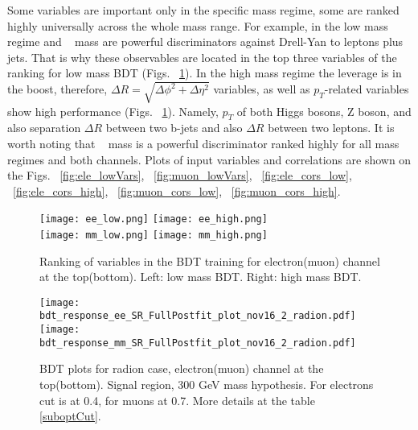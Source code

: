 Some variables are important only in the specific mass regime, some are ranked highly universally across the whole mass range. For example, in the low mass regime \ETmiss and \HBB~ mass are powerful discriminators against Drell-Yan to leptons plus jets. That is why these
observables are located in the top three variables of the ranking for low mass BDT (Figs. ~\ref{fig:ranking}). In the high mass regime the leverage is in the boost, therefore, $\Delta R = \sqrt{\Delta \phi^2 + \Delta \eta^2}$ variables, as well as $p_{T}$-related variables show high performance (Figs. ~\ref{fig:ranking}). Namely, $p_{T}$ of both Higgs bosons, Z boson, and also
separation $\Delta R $  between two b-jets and also $\Delta R$ between  two leptons. It is worth noting that \HBB~ mass is a powerful discriminator ranked highly for all mass regimes and both channels. Plots of input variables and correlations are shown on the Figs. ~\ref{fig:ele_lowVars}, ~\ref{fig:muon_lowVars}, ~\ref{fig:ele_cors_low}, ~\ref{fig:ele_cors_high}, ~\ref{fig:muon_cors_low}, ~\ref{fig:muon_cors_high}.

\begin{figure}[tbp]
  \begin{center}
   \texttt{[image: ee\_low.png]}
   \texttt{[image: ee\_high.png]}\\
   \texttt{[image: mm\_low.png]}
   \texttt{[image: mm\_high.png]}
    \caption{ Ranking of variables in the BDT training for electron(muon) channel at the top(bottom). Left: low mass BDT. Right: high mass BDT.}
    \label{fig:ranking}
  \end{center}
\end{figure}


\begin{figure}[tbp]
  \begin{center}
   \texttt{[image: bdt\_response\_ee\_SR\_FullPostfit\_plot\_nov16\_2\_radion.pdf]}\\
   \texttt{[image: bdt\_response\_mm\_SR\_FullPostfit\_plot\_nov16\_2\_radion.pdf]}\\
    \caption{ BDT plots for radion case, electron(muon) channel at the top(bottom). Signal region, 300 GeV mass hypothesis. For electrons cut is at 0.4, for muons at 0.7. More details at the table \ref{suboptCut}.}
    \label{fig:BDTs}
  \end{center}
\end{figure}




